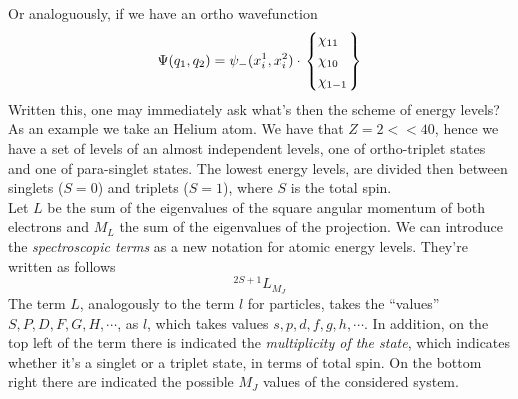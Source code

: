 \documentclass[a4paper, 11pt]{book}
\newcommand{\1}{\opr{\mathds{1}}}
\theoremstyle{plain}
\begin{document}
	Or analoguously, if we have an ortho wavefunction
	\begin{equation}
		\Psi(q_1,q_2)=\psi_-(x_i^1,x_i^2)\cdot\left.\begin{dcases}\chi_{11}\\\chi_{10}\\\chi_{1-1}\end{dcases}\right\}
		\label{eq:orthowave}
	\end{equation}
	Written this, one may immediately ask what's then the scheme of energy levels? As an example we take an Helium atom. We have that $Z=2<<40$, hence we have a set of levels of an almost independent levels, one of ortho-triplet states and one of para-singlet states. The lowest energy levels, are divided then between singlets ($S=0$) and triplets ($S=1$), where $S$ is the total spin.\\
	Let $L$ be the sum of the eigenvalues of the square angular momentum of both electrons and $M_L$ the sum of the eigenvalues of the projection. We can introduce the \textit{spectroscopic terms} as a new notation for atomic energy levels. They're written as follows
	\begin{equation}
		^{2S+1}L_{M_J}
		\label{eq:atomictermsymboldef}
	\end{equation}
	The term $L$, analogously to the term $l$ for particles, takes the ``values'' $S,P,D,F,G,H,\cdots$, as $l$, which takes values $s,p,d,f,g,h,\cdots$. In addition, on the top left of the term there is indicated the \textit{multiplicity of the state}, which indicates whether it's a singlet or a triplet state, in terms of total spin. On the bottom right there are indicated the possible $M_J$ values of the considered system.
\end{document}

